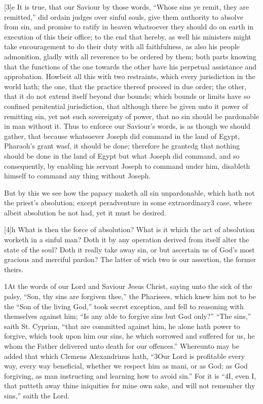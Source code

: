 [3]e It is true, that our Saviour by those words, “Whose sins ye remit, they are remitted,” did ordain judges over sinful souls, give them authority to absolve from sin, and promise to ratify in heaven whatsoever they should do on earth in execution of this their office; to the end that hereby, as well his ministers might take encouragement to do their duty with all faithfulness, as also his people admonition, gladly with all reverence to be ordered by them; both parts knowing that the functions of the one towards the other have his perpetual assistance and approbation. Howbeit all this with two restraints, which every jurisdiction in the world hath; the one, that the practice thereof proceed in due order; the other, that it do not extend itself beyond due bounds; which bounds or limits have so confined penitential jurisdiction, that although there be given unto it power of remitting sin, yet not such sovereignty of power, that no sin should be pardonable in man without it. Thus to enforce our Saviour’s words, is as though we should gather, that because whatsoever Joseph did command in the land of Egypt, Pharaoh’s grant wasf, it should be done; therefore he grantedg that nothing should be done in the land of Egypt but what Joseph did command, and so consequently, by enabling his servant Joseph to command under him, disableth himself to command any thing without Joseph.

But by this we see how the papacy maketh all sin unpardonable, which hath not the priest’s absolution; except peradventure in some extraordinary3 case, where albeit absolution be not had, yet it must be desired.


[4]h What is then the force of absolution? What is it which the act of absolution worketh in a sinful man? Doth it by any operation derived from itself alter the state of the soul? Doth it really take away sin, or but ascertain us of God’s most gracious and merciful pardon? The latter of wich two is our assertion, the former theirs.

1At the words of our Lord and Saviour Jesus Christ, saying unto the sick of the palsy, “Son, thy sins are forgiven thee,” the Pharisees, which knew him not to be the “Son of the living God,” took secret exception, and fell to reasoning with themselves against him; “Is any able to forgive sins but God only?” “The sins,” saith St. Cyprian, “that are committed against him, he alone hath power to forgive, which took upon him our sins, he which sorrowed and suffered for us, he whom the Father delivered unto death for our offences.” Whereunto may be added that which Clemens Alexandrinus hath, “3Our Lord is profitable every way, every way beneficial, whether we respect him as mani, or as God; as God forgiving, as man instructing and learning how to avoid sin.” For it is “4I, even I, that putteth away thine iniquities for mine own sake, and will not remember thy sins,” saith the Lord.

